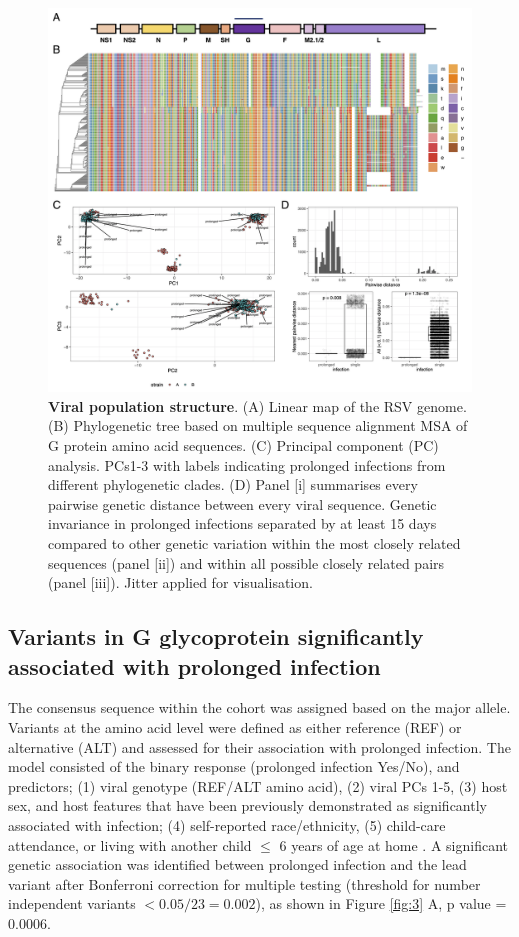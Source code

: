 \documentclass{article} %
\begin{document}
\begin{figure}[ht] \hspace{-0.5cm} 
    \includegraphics[scale=0.8]{f2}
	\caption{\textbf{Viral population structure}.
 (A) Linear map of the RSV genome. (B) Phylogenetic tree based on multiple sequence alignment MSA of G protein amino acid sequences. (C) Principal component (PC) analysis. PCs1-3 with labels indicating prolonged infections from different phylogenetic clades. (D) Panel [i] summarises every pairwise genetic distance between every viral sequence. Genetic invariance in prolonged infections separated by at least 15 days compared to other genetic variation within the most closely related sequences (panel [ii]) and within all possible closely related pairs (panel [iii]). Jitter applied for visualisation.}
	\label{fig:2} 
\end{figure}
\clearpage

\subsection{Variants in G glycoprotein significantly associated with prolonged infection}
The consensus sequence within the cohort was assigned based on the major allele. Variants at the amino acid level were defined as either reference (REF) or alternative (ALT) and assessed for their association with prolonged infection. The model consisted of the binary response (prolonged infection Yes/No), and predictors; (1) viral genotype (REF/ALT amino acid), (2) viral PCs 1-5, (3) host sex, and host features that have been previously demonstrated as significantly associated with infection; (4) self-reported race/ethnicity, (5) child-care attendance, or living with another child $\le$ 6 years of age at home 
\citep{hall1976respiratory}. 
A significant genetic association was identified  between prolonged infection and the lead variant after Bonferroni correction for multiple testing (threshold for number independent variants $< 0.05/23 = 0.002$), as shown in Figure \ref{fig:3} A, p value = 0.0006.
\end{document}
